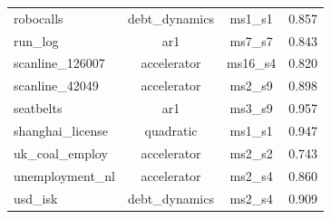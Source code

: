 \begin{table}[htbp]
{\begin{tabular}{lccc}
robocalls & debt\_dynamics & ms1\_s1 & 0.857 \\
run\_log & ar1 & ms7\_s7 & 0.843 \\
scanline\_126007 & accelerator & ms16\_s4 & 0.820 \\
scanline\_42049 & accelerator & ms2\_s9 & 0.898 \\
seatbelts & ar1 & ms3\_s9 & 0.957 \\
shanghai\_license & quadratic & ms1\_s1 & 0.947 \\
uk\_coal\_employ & accelerator & ms2\_s2 & 0.743 \\
unemployment\_nl & accelerator & ms2\_s4 & 0.860 \\
usd\_isk & debt\_dynamics & ms2\_s4 & 0.909 \\
\bottomrule
\end{tabular}%
}
\end{table}
